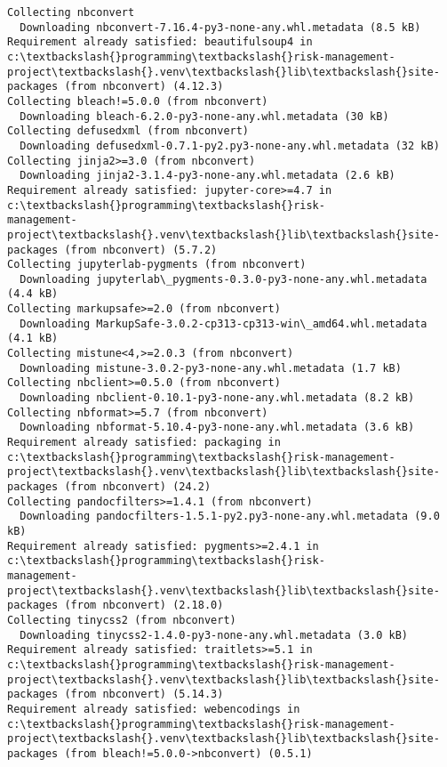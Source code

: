 \documentclass[11pt]{article}
\begin{document}
    \begin{Verbatim}[commandchars=\\\{\}]
Collecting nbconvert
  Downloading nbconvert-7.16.4-py3-none-any.whl.metadata (8.5 kB)
Requirement already satisfied: beautifulsoup4 in c:\textbackslash{}programming\textbackslash{}risk-management-
project\textbackslash{}.venv\textbackslash{}lib\textbackslash{}site-packages (from nbconvert) (4.12.3)
Collecting bleach!=5.0.0 (from nbconvert)
  Downloading bleach-6.2.0-py3-none-any.whl.metadata (30 kB)
Collecting defusedxml (from nbconvert)
  Downloading defusedxml-0.7.1-py2.py3-none-any.whl.metadata (32 kB)
Collecting jinja2>=3.0 (from nbconvert)
  Downloading jinja2-3.1.4-py3-none-any.whl.metadata (2.6 kB)
Requirement already satisfied: jupyter-core>=4.7 in c:\textbackslash{}programming\textbackslash{}risk-
management-project\textbackslash{}.venv\textbackslash{}lib\textbackslash{}site-packages (from nbconvert) (5.7.2)
Collecting jupyterlab-pygments (from nbconvert)
  Downloading jupyterlab\_pygments-0.3.0-py3-none-any.whl.metadata (4.4 kB)
Collecting markupsafe>=2.0 (from nbconvert)
  Downloading MarkupSafe-3.0.2-cp313-cp313-win\_amd64.whl.metadata (4.1 kB)
Collecting mistune<4,>=2.0.3 (from nbconvert)
  Downloading mistune-3.0.2-py3-none-any.whl.metadata (1.7 kB)
Collecting nbclient>=0.5.0 (from nbconvert)
  Downloading nbclient-0.10.1-py3-none-any.whl.metadata (8.2 kB)
Collecting nbformat>=5.7 (from nbconvert)
  Downloading nbformat-5.10.4-py3-none-any.whl.metadata (3.6 kB)
Requirement already satisfied: packaging in c:\textbackslash{}programming\textbackslash{}risk-management-
project\textbackslash{}.venv\textbackslash{}lib\textbackslash{}site-packages (from nbconvert) (24.2)
Collecting pandocfilters>=1.4.1 (from nbconvert)
  Downloading pandocfilters-1.5.1-py2.py3-none-any.whl.metadata (9.0 kB)
Requirement already satisfied: pygments>=2.4.1 in c:\textbackslash{}programming\textbackslash{}risk-
management-project\textbackslash{}.venv\textbackslash{}lib\textbackslash{}site-packages (from nbconvert) (2.18.0)
Collecting tinycss2 (from nbconvert)
  Downloading tinycss2-1.4.0-py3-none-any.whl.metadata (3.0 kB)
Requirement already satisfied: traitlets>=5.1 in c:\textbackslash{}programming\textbackslash{}risk-management-
project\textbackslash{}.venv\textbackslash{}lib\textbackslash{}site-packages (from nbconvert) (5.14.3)
Requirement already satisfied: webencodings in c:\textbackslash{}programming\textbackslash{}risk-management-
project\textbackslash{}.venv\textbackslash{}lib\textbackslash{}site-packages (from bleach!=5.0.0->nbconvert) (0.5.1)

\end{Verbatim}
\end{document}
